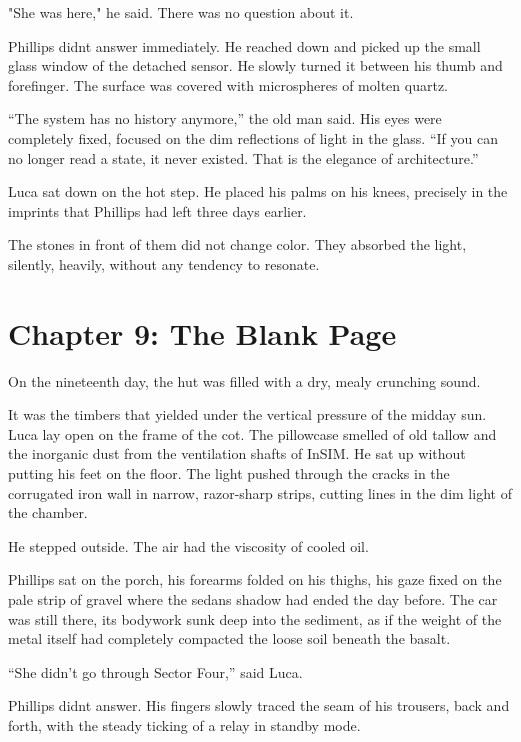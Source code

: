 \documentclass[
  ngerman,
]{article}
\begin{document}
"She was here," he said. There was no question about it.

Phillips didn\textquotesingle t answer immediately. He reached down and
picked up the small glass window of the detached sensor. He slowly
turned it between his thumb and forefinger. The surface was covered with
microspheres of molten quartz.

``The system has no history anymore,'' the old man said. His eyes were
completely fixed, focused on the dim reflections of light in the glass.
``If you can no longer read a state, it never existed. That is the
elegance of architecture.''

Luca sat down on the hot step. He placed his palms on his knees,
precisely in the imprints that Phillips had left three days earlier.

The stones in front of them did not change color. They absorbed the
light, silently, heavily, without any tendency to resonate.

\section{\texorpdfstring{\textbf{Chapter 9: The Blank
Page}}{Chapter 9: The Blank Page}}\label{chapter-9-the-blank-page}

On the nineteenth day, the hut was filled with a dry, mealy crunching
sound.

It was the timbers that yielded under the vertical pressure of the
midday sun. Luca lay open on the frame of the cot. The pillowcase
smelled of old tallow and the inorganic dust from the ventilation shafts
of InSIM. He sat up without putting his feet on the floor. The light
pushed through the cracks in the corrugated iron wall in narrow,
razor-sharp strips, cutting lines in the dim light of the chamber.

He stepped outside. The air had the viscosity of cooled oil.

Phillips sat on the porch, his forearms folded on his thighs, his gaze
fixed on the pale strip of gravel where the sedan\textquotesingle s
shadow had ended the day before. The car was still there, its bodywork
sunk deep into the sediment, as if the weight of the metal itself had
completely compacted the loose soil beneath the basalt.

``She didn't go through Sector Four,'' said Luca.

Phillips didn\textquotesingle t answer. His fingers slowly traced the
seam of his trousers, back and forth, with the steady ticking of a relay
in standby mode.
\end{document}
